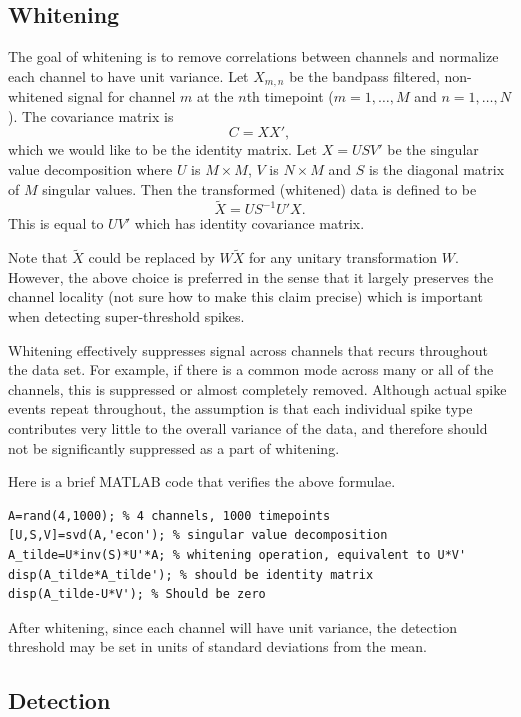 \documentclass{article}
\begin{document}
\subsection{Whitening}

The goal of whitening is to remove correlations between channels and normalize each channel to have unit variance. Let $X_{m,n}$ be the bandpass filtered, non-whitened signal for channel $m$ at the $n$th timepoint ($m=1,\dots,M$ and $n=1,\dots,N$). The covariance matrix is
$$C=X X',$$
which we would like to be the identity matrix. Let
$X=USV'$ be the singular value decomposition where $U$ is $M\times M$, $V$ is $N\times M$ and $S$ is the diagonal matrix of $M$ singular values.
Then the transformed (whitened) data is defined to be
$$\tilde{X}=US^{-1}U'X.$$
This is equal to $UV'$ which has identity covariance matrix.

Note that $\tilde{X}$ could be replaced by $W\tilde{X}$ for any unitary transformation $W$. However, the above choice is preferred in the sense that it largely preserves the channel locality (not sure how to make this claim precise) which is important when detecting super-threshold spikes.

Whitening effectively suppresses signal across channels that recurs throughout the data set. For example, if there is a common mode across many or all of the channels, this is suppressed or almost completely removed. Although actual spike events repeat throughout, the assumption is that each individual spike type contributes very little to the overall variance of the data, and therefore should not be significantly suppressed as a part of whitening.

Here is a brief MATLAB code that verifies the above formulae.

\begin{lstlisting}
A=rand(4,1000); % 4 channels, 1000 timepoints
[U,S,V]=svd(A,'econ'); % singular value decomposition
A_tilde=U*inv(S)*U'*A; % whitening operation, equivalent to U*V'
disp(A_tilde*A_tilde'); % should be identity matrix
disp(A_tilde-U*V'); % Should be zero
\end{lstlisting}

After whitening, since each channel will have unit variance, the detection threshold may be set in units of standard deviations from the mean.

\subsection{Detection}
\end{document}
